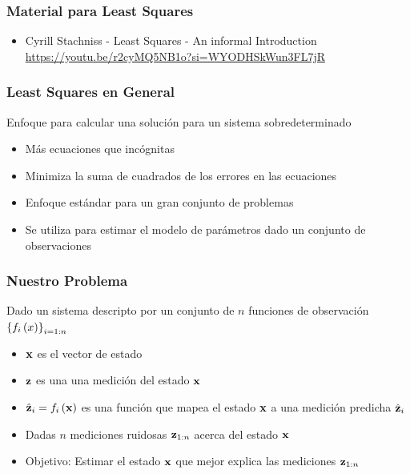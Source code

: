 \begin{frame}
    \frametitle{Material para Least Squares}
    
    
    \begin{itemize}
        \item Cyrill Stachniss - Least Squares - An informal Introduction \url{https://youtu.be/r2cyMQ5NB1o?si=WYODHSkWun3FL7jR}
    \end{itemize}
\end{frame}


\begin{frame}
    \frametitle{Least Squares en General}
    
    Enfoque para calcular una solución para un sistema sobredeterminado

    \begin{itemize}
        \item Más ecuaciones que incógnitas
        \item Minimiza la suma de cuadrados de los errores en las ecuaciones
        \item Enfoque estándar para un gran conjunto de problemas
        \item Se utiliza para estimar el modelo de parámetros dado un conjunto de observaciones
    \end{itemize}
\end{frame}

\begin{frame}
    \frametitle{Nuestro Problema}
    
    Dado un sistema descripto por un conjunto de $n$ funciones de observación $\left\{f_{i}\left(x\right)\right\}_{i=1:n}$

    \begin{itemize}
        \item $\boldsymbol{\mathbf{x}}$ es el vector de estado
        \item $\boldsymbol{\mathbf{z}}$ es una una medición del estado $\boldsymbol{\mathbf{x}}$
        \item $\hat{\boldsymbol{\mathbf{z}}}_{i} = f_{i}\left(\boldsymbol{\mathbf{x}}\right)$ es una función que mapea el estado $\boldsymbol{\mathbf{x}}$ a una medición predicha $\hat{\boldsymbol{\mathbf{z}}}_{i}$
        \item Dadas $n$ mediciones ruidosas $\boldsymbol{\mathbf{z}}_{1:n}$ acerca del estado $\boldsymbol{\mathbf{x}}$
        \item Objetivo: Estimar el estado $\boldsymbol{\mathbf{x}}$ que mejor explica las mediciones $\boldsymbol{\mathbf{z}}_{1:n}$
    \end{itemize}
\end{frame}

